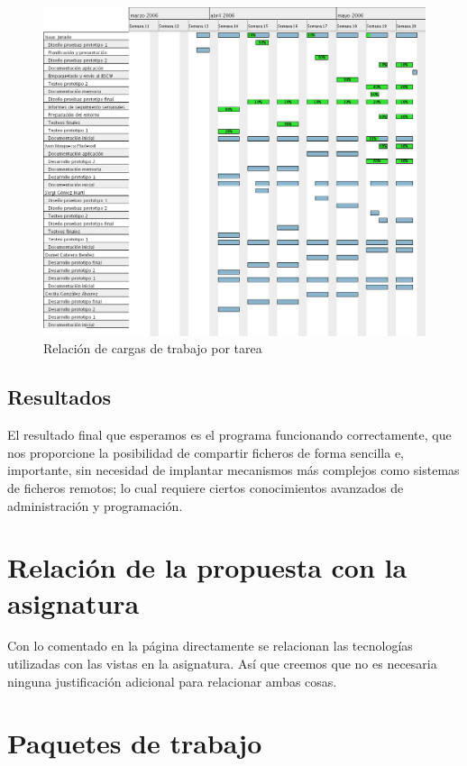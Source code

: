 \documentclass[a4paper,12pt,titlepage]{article}
\begin{document}
\begin{figure}
\begin{center}
\includegraphics[width=\textwidth]{cargas}
\caption{Relación de cargas de trabajo por tarea}\label{cargas1}
\end{center}
\end{figure}


\subsection{Resultados}

El resultado final que esperamos es el programa funcionando correctamente, que
nos proporcione la posibilidad de compartir ficheros de forma sencilla e,
importante, sin necesidad de implantar mecanismos más complejos como sistemas de
ficheros remotos; lo cual requiere ciertos conocimientos avanzados de
administración y programación.


\section{Relación de la propuesta con la asignatura}

Con lo comentado en la página \pageref{tecnologias} directamente se relacionan
las tecnologías utilizadas con las vistas en la asignatura. Así que creemos
que no es necesaria ninguna justificación adicional para relacionar ambas
cosas.


\section{Paquetes de trabajo}
\end{document}
